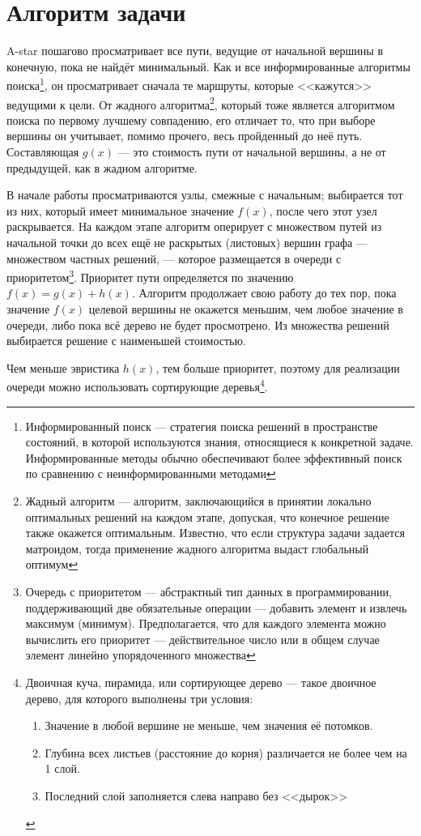 \documentclass[chapterprefix=true,headings=onelineappendix]{scrartcl}
\begin{document}
\newpage{}
\section{Алгоритм задачи}

A-star пошагово просматривает все пути, ведущие от начальной вершины в конечную,
пока не найдёт минимальный. Как и все информированные алгоритмы
поиска\footnote{Информированный поиск --- стратегия поиска решений в
	пространстве состояний, в которой используются знания, относящиеся к
	конкретной задаче. Информированные методы обычно обеспечивают более
	эффективный поиск по сравнению с неинформированными методами}, он просматривает
сначала те маршруты, которые <<кажутся>> ведущими к цели. От жадного
алгоритма\footnote{Жадный алгоритм --- алгоритм, заключающийся в принятии
	локально оптимальных решений на каждом этапе, допуская, что конечное решение
	также окажется оптимальным. Известно, что если структура задачи задается
	матроидом, тогда применение жадного алгоритма выдаст глобальный оптимум},
который тоже является алгоритмом поиска по первому лучшему совпадению, его
отличает то, что при выборе вершины он учитывает, помимо прочего, весь
пройденный до неё путь. Составляющая $g(x)$ --- это стоимость пути от начальной
вершины, а не от предыдущей, как в жадном алгоритме.

В начале работы просматриваются узлы, смежные с начальным; выбирается тот из
них, который имеет минимальное значение $f(x)$, после чего этот узел
раскрывается. На каждом этапе алгоритм оперирует с множеством путей из
начальной точки до всех ещё не раскрытых (листовых) вершин графа — множеством
частных решений, — которое размещается в очереди с приоритетом\footnote{Очередь
	с приоритетом --- абстрактный тип данных в программировании, поддерживающий
	две обязательные операции — добавить элемент и извлечь
	максимум\cite{Sedgewick2011} (минимум). Предполагается, что для каждого
	элемента можно вычислить его приоритет — действительное число или в общем
	случае элемент линейно упорядоченного множества\cite{Ахо2001}}. Приоритет пути
определяется по значению $f(x) = g(x) + h(x)$. Алгоритм продолжает свою работу
до тех пор, пока значение $f(x)$ целевой вершины не окажется меньшим, чем любое
значение в очереди, либо пока всё дерево не будет просмотрено. Из множества
решений выбирается решение с наименьшей стоимостью.

Чем меньше эвристика $h(x)$, тем больше приоритет, поэтому для реализации
очереди можно ис\-поль\-зо\-вать сортирующие деревья\footnote{Двоичная куча,
	пирамида\cite{Кормен2005}, или сортирующее дерево --- такое двоичное дерево,
	для которого выполнены три условия:

	\begin{enumerate}
		\item Значение в любой вершине не меньше, чем значения её потомков.
		\item Глубина всех листьев (расстояние до корня) различается не более чем
		     на 1 слой.
		\item Последний слой заполняется слева направо без <<дырок>>
	\end{enumerate}
}.
\end{document}
